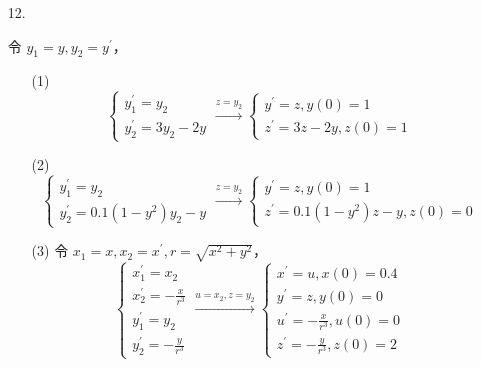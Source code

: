\documentclass{sjtuarticle}
\begin{document}
\begin{itemize}
    \item[12.] \begin{solution}
        令 $y_1=y,y_2=y^\prime$，
        \begin{itemize}
            \item[(1)]
            \begin{equation*}
                \begin{cases}
                    y_1^\prime=y_2\\
                    y_2^\prime=3y_2-2y
                \end{cases}\xrightarrow{z=y_2}
                \begin{cases}
                    y^\prime =z, y(0)=1\\
                    z^\prime = 3z-2y, z(0)=1
                \end{cases}
            \end{equation*}
            \item[(2)] \begin{equation*}
                \begin{cases}
                    y_1^\prime=y_2\\
                    y_2^\prime=0.1(1-y^2)y_2-y
                \end{cases}\xrightarrow{z=y_2}
                \begin{cases}
                    y^\prime =z,y(0)=1\\
                    z^\prime =0.1(1-y^2)z-y,z(0)=0
                \end{cases}
            \end{equation*}
            \item[(3)] 令 $x_1=x,x_2=x^\prime,r=\sqrt{x^2+y^2}$，\begin{equation*}
                \begin{cases}
                    x_1^\prime=x_2\\
                    x_2^\prime=-\frac{x}{r^3}\\
                    y_1^\prime=y_2\\
                    y_2^\prime=-\frac{y}{r^3}
                \end{cases}
                \xrightarrow{u=x_2,z=y_2}
                \begin{cases}
                    x^\prime=u, x(0)=0.4\\
                    y^\prime=z, y(0)=0\\
                    u^\prime=-\frac{x}{r^3}, u(0)=0\\
                    z^\prime=-\frac{y}{r^3}, z(0)=2
                \end{cases}
            \end{equation*}
        \end{itemize}
    \end{solution}


\end{itemize}
\end{document}
